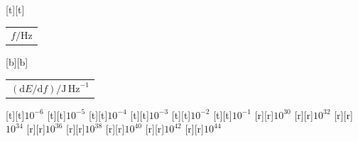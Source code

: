 %    
%
%
\begin{psfrags}%
\psfragscanon%
%
[t][t]{\color[rgb]{0,0,0}\setlength{\tabcolsep}{0pt}\begin{tabular}{c}{\Large$f/\mathrm{Hz}$}\end{tabular}}%
[b][b]{\color[rgb]{0,0,0}\setlength{\tabcolsep}{0pt}\begin{tabular}{c}{\Large$(\mathrm{d}E/\mathrm{d}{f})/\mathrm{J\,Hz}^{-1}$}\end{tabular}}%
%
[t][t]{$10^{-6}$}%
[t][t]{$10^{-5}$}%
[t][t]{$10^{-4}$}%
[t][t]{$10^{-3}$}%
[t][t]{$10^{-2}$}%
[t][t]{$10^{-1}$}%
%
[r][r]{$10^{30}$}%
[r][r]{$10^{32}$}%
[r][r]{$10^{34}$}%
[r][r]{$10^{36}$}%
[r][r]{$10^{38}$}%
[r][r]{$10^{40}$}%
[r][r]{$10^{42}$}%
[r][r]{$10^{44}$}%
%
%
\end{psfrags}%
%

